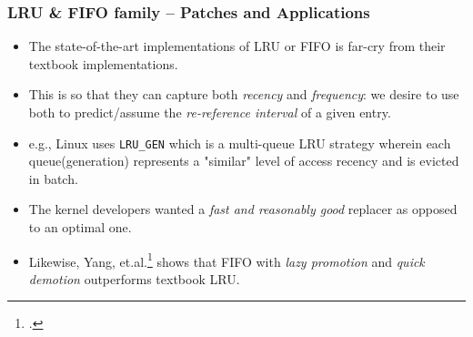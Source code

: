 \documentclass{beamer}
\begin{document}
\begin{frame}
    \frametitle{LRU \& FIFO family -- Patches and Applications}
    \begin{itemize}
        \item The state-of-the-art implementations of LRU or FIFO is far-cry from their textbook implementations.
        \item This is so that they can capture both \emph{recency} and \emph{frequency}:
              we desire to use both to predict/assume the \emph{re-reference interval} of a given entry.
        \item e.g., Linux uses \texttt{LRU\_GEN} which is a multi-queue LRU strategy wherein each queue(generation) represents a "similar" level of access recency and is evicted in batch.
        \item The kernel developers wanted a \emph{fast and reasonably good} replacer as opposed to an optimal one.
        \item Likewise, Yang, et.al.\footcite{YQZYR.2023.FIFOwithTwist} shows that FIFO with \textit{lazy promotion} and \textit{quick demotion} outperforms textbook LRU.
    \end{itemize}
\end{frame}
\end{document}
